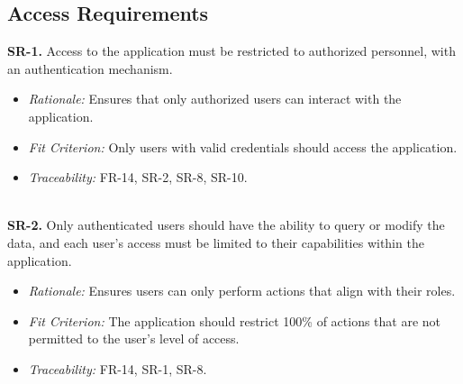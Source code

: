 \documentclass[12pt]{article}
\begin{document}
\subsection{Access Requirements}
\textbf{SR-1.} Access to the application must be restricted to
  authorized personnel, with an authentication mechanism.
  \begin{itemize}
    \item \textit{Rationale:} Ensures that only authorized users can interact
    with the application.
    \item \textit{Fit Criterion:} Only users with valid credentials should
    access the application.
    \item \textit{Traceability:} FR-14, SR-2, SR-8, SR-10.
  \end{itemize}
\ \\
\textbf{SR-2.} Only authenticated users should have the ability to
  query or modify the data, and each user’s access must be limited to their
  capabilities within the application.
  \begin{itemize}
    \item \textit{Rationale:} Ensures users can only perform actions that align
    with their roles.
    \item \textit{Fit Criterion:} The application should restrict 100\% of
    actions that are not permitted to the user's level of access.
    \item \textit{Traceability:} FR-14, SR-1, SR-8.
  \end{itemize}
\end{document}
